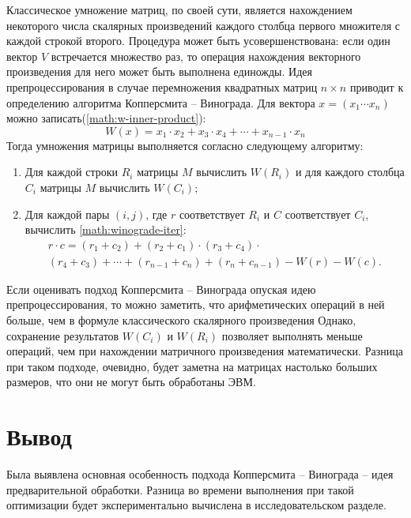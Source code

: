 Классическое умножение матриц, по своей сути, является нахождением некоторого числа скалярных произведений каждого столбца первого множителя с каждой строкой второго. Процедура может быть усовершенствована: если один вектор $V$ встречается множество раз, то операция нахождения векторного произведения для него может быть выполнена единожды. Идея препроцессирования в случае перемножения квадратных матриц $n \times n$ приводит к определению алгоритма Копперсмита – Винограда. Для вектора $x = \left(x_1 \cdots x_n\right)$ можно записать(\ref{math:w-inner-product}):
\begin{equation}\label{math:w-inner-product}
	W(x) = x_1 \cdot x_2 + x_3 \cdot x_4 + \cdots + x_{n - 1} \cdot x_n
\end{equation}
Тогда умножения матрицы выполняется согласно следующему алгоритму:
\begin{enumerate}
	\item Для каждой строки $R_i$ матрицы $M$ вычислить $W(R_i)$ и для каждого столбца $C_i$ матрицы $M$ вычислить $W(C_i)$;
	\item Для каждой пары $(i ,j)$, где $r$ соответствует $R_i$ и $C$ соответствует $C_i$, вычислить \ref{math:winograde-iter}:
	\begin{equation}\label{math:winograde-iter} 
		\begin{array}{cc}
			r \cdot c = \left(r_1 + c_2\right) + \left(r_2 + c_1\right) \cdot \left(r_3 + c_4\right) \cdot \\
			\left(r_4 + c_3\right) + \cdots +  \left(r_{n - 1} + c_n\right) + \left(r_{n} + c_{n - 1}\right) - W\left(r\right) - W\left(c\right).
		\end{array}
	\end{equation}
\end{enumerate}

Если оценивать подход Копперсмита – Винограда опуская идею препроцессирования, то можно заметить, что арифметических операций в ней больше, чем в формуле классического скалярного произведения Однако, сохранение результатов $W(C_i)$ и $W(R_i)$ позволяет выполнять меньше операций, чем при нахождении матричного произведения математически. Разница при таком подходе, очевидно, будет заметна на матрицах настолько больших размеров, что они не могут быть обработаны ЭВМ. 

\section{Вывод}
Была выявлена основная особенность подхода Копперсмита – Винограда -- идея предварительной обработки. Разница во времени выполнения при такой оптимизации будет экспериментально вычислена в исследовательском разделе. 